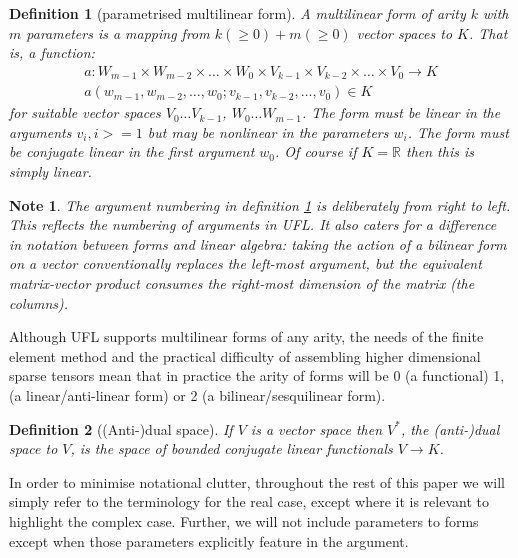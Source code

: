 \documentclass[a4paper,11pt]{article}
\newtheorem{definition}{Definition}[section]
\newtheorem{note}{Note}[section]
\begin{document}
\begin{definition}[parametrised multilinear form]\label{kform}
    A \emph{multilinear form} of \emph{arity} $k$  with $m$ \emph{parameters} is a mapping from $k(\ge0) + m(\ge0)$ vector spaces to $K$. That is, a function:
    \begin{gather} 
    a:W_{m-1} \times W_{m-2} \times \ldots \times W_{0} \times V_{k-1} \times V_{k-2} \times \ldots \times V_{0} \rightarrow K\\
    a(w_{m-1}, w_{m-2}, \ldots, w_0; v_{k-1}, v_{k-2}, \ldots, v_0) \in K
    \end{gather} 
    for suitable vector spaces $V_0\ldots V_{k-1}$, $W_0\ldots W_{m-1}$. The form must be linear in the arguments $v_i, i>=1$ but may be nonlinear in the parameters $w_i$. The form must be conjugate linear in the first argument $w_0$. Of course if $K=\mathbb{R}$ then this is simply linear.
\end{definition}

\begin{note}
    The argument numbering in definition \ref{kform} is deliberately from right to left. This reflects the numbering of arguments in UFL. It also caters for a difference in notation between forms and linear algebra: taking the action of a bilinear form on a vector conventionally replaces the left-most argument, but the equivalent matrix-vector product consumes the right-most dimension of the matrix (the columns).
\end{note}

Although UFL supports multilinear forms of any arity, the needs of the finite element method and the practical difficulty of assembling higher dimensional sparse tensors mean that in practice the arity of forms will be 0 (a functional) 1, (a linear/anti-linear form) or 2 (a bilinear/sesquilinear form). 

\begin{definition}[(Anti-)dual space]\label{dualspace}
    If $V$ is a vector space then $V^*$, the (anti-)dual space to $V$, is the space of bounded conjugate linear functionals $V\rightarrow K$.
\end{definition}

In order to minimise notational clutter, throughout the rest of this paper we will simply refer to the terminology for the real case, except where it is relevant to highlight the complex case. Further, we will not include parameters to forms except when those parameters explicitly feature in the argument.
\end{document}
